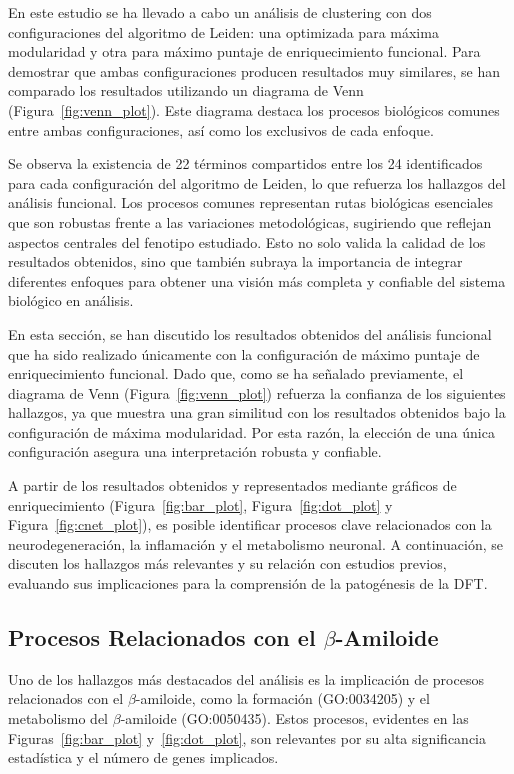 En este estudio se ha llevado a cabo un análisis de clustering con dos configuraciones del algoritmo de Leiden: una optimizada para máxima modularidad y otra para máximo puntaje de enriquecimiento funcional. Para demostrar que ambas configuraciones producen resultados muy similares, se han comparado los resultados utilizando un diagrama de Venn (Figura~\ref{fig:venn_plot}). Este diagrama destaca los procesos biológicos comunes entre ambas configuraciones, así como los exclusivos de cada enfoque.

Se observa la existencia de 22 términos compartidos entre los 24 identificados para cada configuración del algoritmo de Leiden, lo que refuerza los hallazgos del análisis funcional. Los procesos comunes representan rutas biológicas esenciales que son robustas frente a las variaciones metodológicas, sugiriendo que reflejan aspectos centrales del fenotipo estudiado. Esto no solo valida la calidad de los resultados obtenidos, sino que también  subraya la importancia de integrar diferentes enfoques para obtener una visión más completa y confiable del sistema biológico en análisis.

En esta sección, se han discutido los resultados obtenidos del análisis funcional que ha sido realizado únicamente con la configuración de máximo puntaje de enriquecimiento funcional. Dado que, como se ha señalado previamente, el diagrama de Venn (Figura~\ref{fig:venn_plot}) refuerza la confianza de los siguientes hallazgos, ya que muestra una gran similitud con los resultados obtenidos bajo la configuración de máxima modularidad. Por esta razón, la elección de una única configuración asegura una interpretación robusta y confiable.

A partir de los resultados obtenidos y representados mediante gráficos de enriquecimiento (Figura~\ref{fig:bar_plot}, Figura~\ref{fig:dot_plot} y Figura~\ref{fig:cnet_plot}), es posible identificar procesos clave relacionados con la neurodegeneración, la inflamación y el metabolismo neuronal. A continuación, se discuten los hallazgos más relevantes y su relación con estudios previos, evaluando sus implicaciones para la comprensión de la patogénesis de la DFT.

\subsection{Procesos Relacionados con el \(\beta\)-Amiloide}

Uno de los hallazgos más destacados del análisis es la implicación de procesos relacionados con el \(\beta\)-amiloide, como la formación (GO:0034205) y el metabolismo del \(\beta\)-amiloide (GO:0050435). Estos procesos, evidentes en las Figuras~\ref{fig:bar_plot} y~\ref{fig:dot_plot}, son relevantes por su alta significancia estadística y el número de genes implicados.


